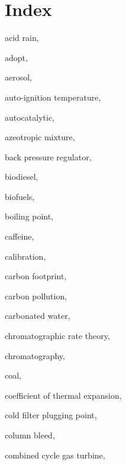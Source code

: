 
\chapter{Index} %



\begin{theindex}


  \item \lowercase {acid rain}, 
  \item \lowercase {adopt}, 
  \item \lowercase {aerosol}, 
  \item \lowercase {auto-ignition temperature}, 
  \item \lowercase {autocatalytic}, 
  \item \lowercase {azeotropic mixture}, 
  \item \lowercase {back pressure regulator}, 
  \item \lowercase {biodiesel}, 
  \item \lowercase {biofuels}, 
  \item \lowercase {boiling point}, 
  \item \lowercase {caffeine}, 
  \item \lowercase {calibration}, 
  \item \lowercase {carbon footprint}, 
  \item \lowercase {carbon pollution}, 
  \item \lowercase {carbonated water}, 
  \item \lowercase {chromatographic rate theory}, 
  \item \lowercase {chromatography}, 
  \item \lowercase {coal}, 
  \item \lowercase {coefficient of thermal expansion}, 
  \item \lowercase {cold filter plugging point}, 
  \item \lowercase {column bleed}, 
  \item \lowercase {combined cycle gas turbine}, 

\end{theindex}
